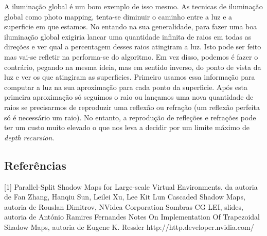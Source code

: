 \documentclass[12pt]{article}
\begin{document}
A iluminação global é um bom exemplo de isso mesmo. As tecnicas de iluminação global como photo mapping, tenta-se diminuir o caminho entre a luz e a superficie em que estamos. No entando na sua generalidade, para fazer uma boa iluminação global exigiria lancar uma quantidade infinita de raios em todas as direções e ver qual a percentagem desses raios atingiram a luz. Isto pode ser feito mas vai-se refletir na performa-se do algoritmo. Em vez disso, podemos é fazer o contrário, pegando na mesma ideia, mas em sentido inverso, do ponto de vista da luz e ver os que atingiram as superficies. Primeiro usamos essa informação para computar a luz na sua aproximação para cada ponto da superficie. Após esta primeira aproximação só seguimos o raio ou lançamos uma nova quantidade de raios se precisarmos de reproduzir uma reflexão ou refração (um reflexão perfeita só é necessário um raio). No entanto, a reprodução de refleções e refrações pode ter um custo muito elevado o que nos leva a decidir por um limite máximo de {\it depth recursion}.

\subsection{Referências}

[1] Parallel-Split Shadow Maps for Large-scale Virtual Environments, da autoria de Fan Zhang, Hanqiu Sun, Leilei Xu, Lee Kit Lun \newline
[2] Cascaded Shadow Maps, autoria de Rouslan Dimitrov, NVidea Corporation \newline
[3] Sombras CG LEI, slides, autoria de António Ramires Fernandes \newline
[4] Notes On Implementation Of Trapezoidal Shadow Maps, autoria de Eugene K. Ressler \newline
[5] http://http.developer.nvidia.com/ \newline
\end{document}
